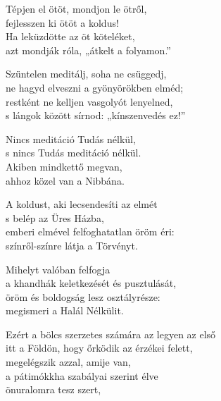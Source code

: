 \begin{dhpverse}

 Tépjen el ötöt, mondjon le ötről,\\
fejlesszen ki ötöt a koldus!\\
Ha leküzdötte az öt köteléket,\\
azt mondják róla, „átkelt a folyamon.”

 Szüntelen meditálj, soha ne csüggedj,\\
ne hagyd elveszni a gyönyörökben elméd;\\
restként ne kelljen vasgolyót lenyelned,\\
s lángok között sírnod: „kínszenvedés ez!”

 Nincs meditáció Tudás nélkül,\\
s nincs Tudás meditáció nélkül.\\
Akiben mindkettő megvan,\\
ahhoz közel van a Nibbána.

 A koldust, aki lecsendesíti az elmét\\
s belép az Üres Házba,\\
emberi elmével felfoghatatlan öröm éri:\\
színről-színre látja a Törvényt.

 Mihelyt valóban felfogja\\
a khandhák keletkezését és pusztulását,\\
öröm és boldogság lesz osztályrésze:\\
megismeri a Halál Nélkülit.

 Ezért a bölcs szerzetes számára az legyen az első\\
itt a Földön, hogy őrködik az érzékei felett,\\
megelégszik azzal, amije van,\\
a pátimókkha szabályai szerint élve\\
önuralomra tesz szert,

\end{dhpverse}
\newpage
